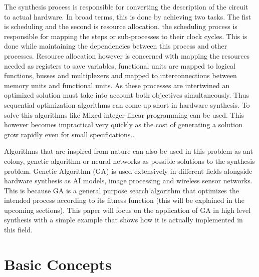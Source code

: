 \documentclass[conference]{IEEEtran}
\begin{document}
The synthesis process is responsible for converting the description of the circuit to actual hardware. In broad terms, this is done by achieving two tasks. The fist is scheduling and the second is resource allocation. the scheduling process is responsible for mapping the steps or sub-processes to their clock cycles. This is done while maintaining the dependencies between this process and other processes. Resource allocation however is concerned with mapping the resources needed as registers to save variables, functional units are mapped to logical functions, busses and multiplexers and mapped to interconnections between memory units and functional units\cite{5209958}. As these processes are intertwined an optimized solution must take into account both objectives simultaneously. Thus sequential optimization algorithms can come up short in hardware synthesis. To solve this algorithms like Mixed integer-linear programming can be used. This however becomes impractical very quickly as the cost of generating a solution grow rapidly even for small specifications.\cite{31534}.

Algorithms that are inspired from nature can also be used in this problem as ant colony, genetic algorithm or neural networks as possible solutions to the synthesis problem. Genetic Algorithm (GA) is used extensively in different fields alongside hardware synthesis as AI models, image processing and wireless sensor networks. This is because GA is a general purpose search algorithm that optimizes the intended process according to its fitness function (this will be explained in the upcoming sections). This paper will focus on the application of GA in high level synthesis with a simple example that shows how it is actually implemented in this field.
\section{Basic Concepts}
\end{document}
